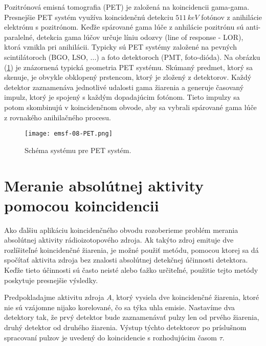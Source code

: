 \documentclass[../../main.tex]{subfiles}
\begin{document}
Pozitrónová emisná tomografia (PET) je založená na koincidencii gama-gama. Presnejšie PET systém využíva koincidenčnú detekciu $511\,keV$ fotónov z anihilácie elektrónu s pozitrónom. Keďže spárované gama lúče z anhilácie pozitrónu sú anti-paralelné, detekcia gama lúčov určuje líniu odozvy (line of response - LOR), ktorá vznikla pri anihilácii. Typicky sú PET systémy založené na pevných scintilátoroch (BGO, LSO, ...) a foto detektoroch (PMT, foto-dióda). Na obrázku (\ref{em8:fig:PET}) je znázornená typická geometria PET systému. Skúmaný predmet, ktorý sa skenuje, je obvykle obklopený prstencom, ktorý je zložený z detektorov. Každý detektor zaznamenáva jednotlivé udalosti gama žiarenia a generuje časovaný impulz, ktorý je spojený s každým dopadajúcim fotónom. Tieto impulzy sa potom skombinujú v koincidenčnom obvode, aby sa vybrali spárované gama lúče z rovnakého anihilačného procesu.

\begin{figure}[!h]
\texttt{[image: emsf-08-PET.png]}
\centering
\caption{Schéma systému pre PET systém.}
\label{em8:fig:PET}
\end{figure}

\section{Meranie absolútnej aktivity pomocou koincidencii}
Ako ďalšiu aplikáciu koincidenčného obvodu rozoberieme problém merania absolútnej aktivity rádioizotopového zdroja. Ak takýto zdroj emituje dve rozlíšiteľné koincidenčné žiarenia, je možné použiť metódu, pomocou ktorej sa dá spočítať aktivita zdroja bez znalosti absolútnej detekčnej účinnosti detektora. Keďže tieto účinnosti sú často neisté alebo ťažko určiteľné, použitie tejto metódy poskytuje presnejšie výsledky. 

Predpokladajme aktivitu zdroja $A$, ktorý vysiela dve koincidenčné žiarenia, ktoré nie sú vzájomne nijako korelované, čo sa týka uhla emisie. Nastavíme dva detektory tak, že prvý detektor bude zaznamenávať pulzy len od prvého žiarenia, druhý detektor od druhého žiarenia. Výstup týchto detektorov po príslušnom spracovaní pulzov je uvedený do koincidencie s rozhodujúcim časom $\tau$. 
\end{document}
